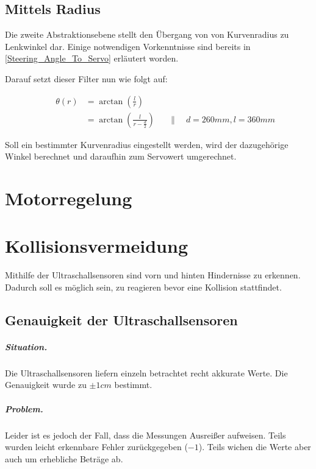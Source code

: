\documentclass[a4paper,12pt]{report}
\begin{document}
\section{Mittels Radius}

	Die zweite Abstraktionsebene stellt den Übergang von von Kurvenradius zu Lenkwinkel dar.
	Einige notwendigen Vorkenntnisse sind bereits in \autoref{Steering_Angle_To_Servo} erläutert worden.
	
	Darauf setzt dieser Filter nun wie folgt auf:
	
		\begin{align*}
		&&\theta\left(r\right) &= \arctan\left( \frac{l}{r} \right)\\
		&&&= \arctan\left( \frac{l}{r - \frac{d}{2}} \right) &&\|\quad d = 260mm, l = 360mm
		\end{align*}


	Soll ein bestimmter Kurvenradius eingestellt werden, wird der dazugehörige Winkel berechnet und daraufhin zum Servowert umgerechnet.


\chapter{Motorregelung}	

\chapter{Kollisionsvermeidung}

	Mithilfe der Ultraschallsensoren sind vorn und hinten Hindernisse zu erkennen.
	Dadurch soll es möglich sein, zu reagieren bevor eine Kollision stattfindet.

\section{Genauigkeit der Ultraschallsensoren}

	\paragraph{Situation.}
	Die Ultraschallsensoren liefern einzeln betrachtet recht akkurate Werte.
	Die Genauigkeit wurde zu $\pm1cm$ bestimmt.
	
	\paragraph{Problem.}
	Leider ist es jedoch der Fall, dass die Messungen Ausreißer aufweisen.
	Teils wurden leicht erkennbare Fehler zurückgegeben ($-1$). Teils wichen die Werte aber auch um erhebliche Beträge ab.
	
\end{document}
